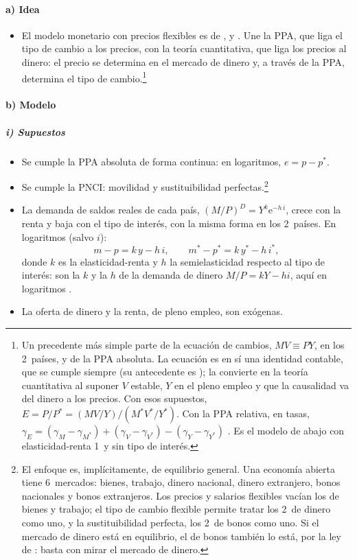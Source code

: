 \documentclass[11pt]{article}
\begin{document}
\paragraph{a) Idea}
\begin{itemize}
\item El modelo monetario con precios flexibles es de \textcite{Frenkel1976Monetary}, \textcite{Mussa1976Exchange} y \textcite{Bilson1978Monetary}. Une la PPA, que liga el tipo de cambio a los precios, con la teoría cuantitativa, que liga los precios al dinero: el precio se determina en el mercado de dinero y, a través de la PPA, determina el tipo de cambio.\footnote{Un precedente más simple parte de la ecuación de cambios, $MV\equiv PY$, en los 2~países, y de la PPA absoluta. La ecuación es en sí una identidad contable, que se cumple siempre (su antecedente es \textcite{Hume1752Money}); \textcite{Fisher1911Purchasing} la convierte en la teoría cuantitativa al suponer $V$ estable, $Y$ en el pleno empleo y que la causalidad va del dinero a los precios. Con esos supuestos, $E=P/P^*=(MV/Y)/(M^*V^*/Y^*)$. Con la PPA relativa, en tasas, $\gamma_E=(\gamma_M-\gamma_{M^*})+(\gamma_V-\gamma_{V^*})-(\gamma_Y-\gamma_{Y^*})$ . Es el modelo de abajo con elasticidad-renta 1~y sin tipo de interés.}
\end{itemize}

\paragraph{b) Modelo}
\subparagraph{i) Supuestos}
\begin{itemize}
\item Se cumple la PPA absoluta de forma continua: en logaritmos, $e=p-p^*$.
\item Se cumple la PNCI: movilidad y sustituibilidad perfectas.\footnote{El enfoque es, implícitamente, de equilibrio general. Una economía abierta tiene 6~mercados: bienes, trabajo, dinero nacional, dinero extranjero, bonos nacionales y bonos extranjeros. Los precios y salarios flexibles vacían los de bienes y trabajo; el tipo de cambio flexible permite tratar los 2~de dinero como uno, y la sustituibilidad perfecta, los 2~de bonos como uno. Si el mercado de dinero está en equilibrio, el de bonos también lo está, por la ley de : basta con mirar el mercado de dinero.}
\item La demanda de saldos reales de cada país, $(M/P)^D=Y^k\mathrm{e}^{-h\,i}$, crece con la renta y baja con el tipo de interés, con la misma forma en los 2~países. En logaritmos (salvo $i$):
  \begin{equation}\label{eq:demanda-dinero-log}
  m-p=k\,y-h\,i,\qquad m^*-p^*=k\,y^*-h\,i^* ,
  \end{equation}
  donde $k$ es la elasticidad-renta y $h$ la semielasticidad respecto al tipo de interés: son la $k$ y la $h$ de la demanda de dinero $M/P=kY-hi$, aquí en logaritmos .
\item La oferta de dinero y la renta, de pleno empleo, son exógenas.
\end{itemize}
\end{document}
